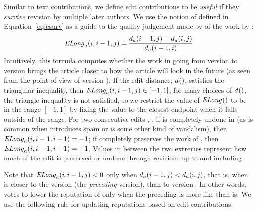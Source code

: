 Similar to text contributions, we define edit contributions to
be \textit{useful} if they \textit{survive} revision by multiple
later authors.
We use the notion of  defined in
Equation~\ref{eq:esurv} as a guide to the quality judgement
made by  of the work by :
\begin{equation*}
\mathit{ELong}_{a}(i,i-1,j) = \frac{d_{a}(i-1,j) - d_{a}(i,j)}
                        {d_{a}(i-1,i)}
\end{equation*}
Intuitively, this formula computes whether the work in going
from version  to version  brings the
article closer to how the article will look in the future
(as seen from the point of view of version ).
If the edit distance, $d_{}()$,
satisfies the triangular inequality,
then $\mathit{ELong}_{a}(i,i-1,j) \in [-1,1]$; for many choices of $d_{}()$,
the triangle inequality is not satisfied, so
we restrict the value of $\mathit{ELong}_{}()$ to be in the range $[-1,1]$
by fixing the value to the closest endpoint when
it falls outside of the range.
For two consecutive edits , ,
if  is completely undone in 
(as is common when  introduces spam or is some other
kind of vandalism), then $\mathit{ELong}_{a}(i,i-1,i+1) = -1$;
if  completely preserves the work of ,
then $\mathit{ELong}_{a}(i,i-1,i+1) = +1$.
Values in between the two extremes represent how much of the edit is
preserved or undone through revisions up to and including .

Note that $\mathit{ELong}_{a}(i,i-1,j) < 0$
only when
$d_{a}(i-1,j) < d_{a}(i,j)$,
that is,
when  is closer to the version 
(the \textit{preceding} version), than to version .
In other words, 
votes to lower the reputation of 
only when the preceding  is more like 
than  is.
We use the following rule for updating reputations based on
edit contributions.


